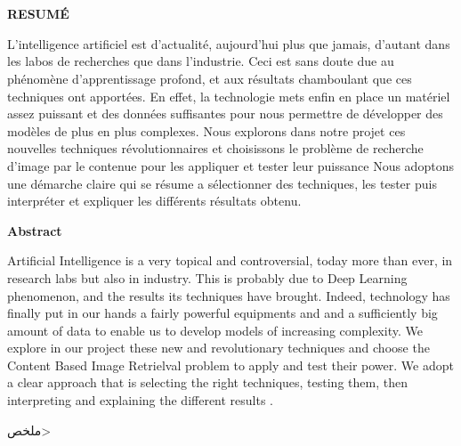 
\chapter*{}%


\begin{center}
\begin{Huge}
\textbf{RESUMÉ}\\

\end{Huge}
\end{center}


L'intelligence artificiel est d’actualité, aujourd'hui plus que jamais, d'autant dans les labos de recherches que dans l'industrie. Ceci est sans doute due au phénomène d’apprentissage profond, et aux résultats chamboulant que ces techniques ont apportées. En effet, la technologie mets enfin en place un matériel assez puissant et des données suffisantes pour nous permettre de développer des modèles de plus en plus complexes. Nous explorons dans notre projet ces nouvelles techniques révolutionnaires et choisissons le problème de recherche d'image par le contenue pour les appliquer et tester leur puissance Nous adoptons une démarche claire qui se résume a sélectionner des techniques, les tester puis interpréter et expliquer les différents résultats obtenu.\\

\begin{center}
\begin{Huge}
\textbf{Abstract}
\end{Huge}
\end{center}

Artificial Intelligence is a very topical and controversial, today more than ever, in research labs but also in industry. This is probably due to Deep Learning phenomenon, and the results its techniques have brought. Indeed, technology has finally put in our hands a fairly powerful equipments and and a sufficiently big amount of data to enable us to develop models of increasing complexity. We explore in our project these new and revolutionary techniques and choose the Content Based Image Retrielval problem to apply and test their power. We adopt a clear approach that is selecting the right techniques, testing them, then interpreting and explaining the different results .\\


\begin{center}
\begin{Huge}
\<ملخص>\\
\end{Huge}
\end{center}

